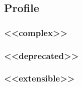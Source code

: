\subsection{Profile} \label{sec:Profile}

\subsubsection{<<complex>>}
  \label{sec:complex}





\FloatBarrier

\subsubsection{<<deprecated>>}
  \label{sec:deprecated}





\FloatBarrier

\subsubsection{<<extensible>>}
  \label{sec:extensible}





\FloatBarrier
